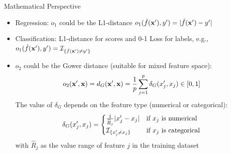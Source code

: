\documentclass[11pt,compress,t,notes=noshow, aspectratio=169, xcolor=table, usenames,dvipsnames]{beamer}
\begin{document}
\begin{frame}{Mathematical Perspective }
	
	\begin{itemize}
		\item Regression: $o_1$ could be the L1-distance $o_1(\fh(\xv'), y') = |\fh(\xv')-y'|$
		\item Classification:
		L1-distance for scores and 0-1 Loss for labels, e.g., $o_1(\fh(\xv'), y') = \Ind_{\{ \fh(\xv') \neq y' \}}$
		\pause
		\item $o_2$ could be the Gower distance (suitable for mixed feature space):
		$$o_2(\xv', \xv) = \Gower(\xv', \xv) = \frac{1}{p}\sum_{j = 1}^{p} \delta_G(x'_j, x_j)	\in [0, 1]$$
		The value of $\delta_G$ depends on the feature type (numerical or categorical):
		\begin{equation*}
		\delta_G(x'_j, x_j) =
		\begin{cases}
		\frac{1}{\widehat{R}_j}|x_j'- x_j| & \text{if $x_j$ is numerical} \\
		\Ind_{\{ x_j' \neq x_j \}} & \text{if $x_j$ is categorical}
		\end{cases}
		\end{equation*}
		with $\widehat{R}_j$ as the value range of feature $j$ in the training dataset
	\end{itemize}
\end{frame}
\end{document}
